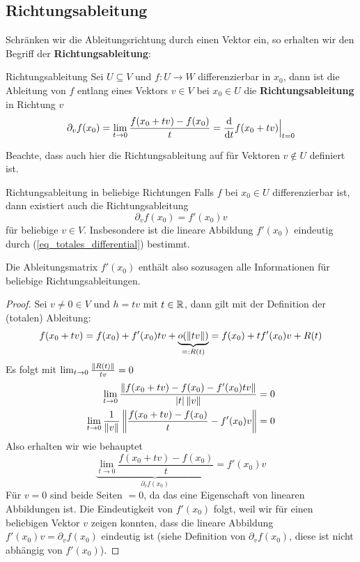 \subsection{Richtungsableitung}
Schränken wir die Ableitungsrichtung durch einen Vektor ein, so erhalten wir den Begriff der \textbf{Richtungsableitung}:
\begin{definition}{Richtungsableitung}{}
Sei $U \subseteq V$ und $f: U \to W$ differenzierbar in $x_0$, dann ist die Ableitung von $f$ entlang eines Vektors $v \in V$ bei $x_0 \in U$ die \textbf{Richtungsableitung} in Richtung $v$
$$\partial_v f(x_0) = \lim_{t \to 0} \frac{f(x_0 + tv) - f(x_0)}{t} = \diff{}t f(x_0+ tv) \Big\vert_{t=0}$$
\end{definition}
\begin{remark}
Beachte, dass auch hier die Richtungsableitung auf für Vektoren $v \notin U$ definiert ist. 
\end{remark}
\begin{lemma}{Richtungsableitung in beliebige Richtungen}{}
Falls $f$ bei $x_0 \in U$ differenzierbar ist, dann existiert auch die Richtungsableitung
$$\partial_v f(x_0) = f'(x_0)v$$
für beliebige $v \in V$. Insbesondere ist die lineare Abbildung $f'(x_0)$ eindeutig durch (\ref{eq_totales_differential}) bestimmt.
\end{lemma}
Die Ableitungsmatrix $f'(x_0)$ enthält also sozusagen alle Informationen für beliebige Richtungsableitungen.
\begin{proof}
Sei $v \neq 0 \in V$ und $h = tv$ mit $t \in \mathbb{R}$, dann gilt mit der Definition der (totalen) Ableitung:
$$f(x_0 + tv) = f(x_0) + f'(x_0)tv + \underbrace{o(\left\|tv\right\|)}_{=: R(t)} = f(x_0) + tf'(x_0)v + R(t)$$
Es folgt mit $\lim_{t \to 0} \frac{\left\|R(t)\right\|}{tv} = 0$
\begin{align*}
    \lim_{t\to 0} \frac{\left\|f(x_0+ tv) -f(x_0) -f'(x_0)tv\right\|}{\left|t\right|\left\|v\right\|} &= 0\\ 
    \lim_{t\to 0} \frac{1}{\left\|v\right\|}\left\|\frac{f(x_0+ tv) -f(x_0)}{t}-f'(x_0)v\right\| &= 0
\end{align*}
Also erhalten wir wie behauptet
$$\underbrace{\lim_{t \to 0} \frac{f(x_0 + tv) - f(x_0)}{t}}_{\partial_v f(x_0)}= f'(x_0) v$$
Für $v=0$ sind beide Seiten $=0$, da das eine Eigenschaft von linearen Abbildungen ist. Die Eindeutigkeit von $f'(x_0)$ folgt, weil wir für einen beliebigen Vektor $v$ zeigen konnten, dass die lineare Abbildung $f'(x_0)v = \partial_v f(x_0)$ eindeutig ist (siehe Definition von $\partial_v f(x_0)$, diese ist nicht abhängig von $f'(x_0)$).
\end{proof}

